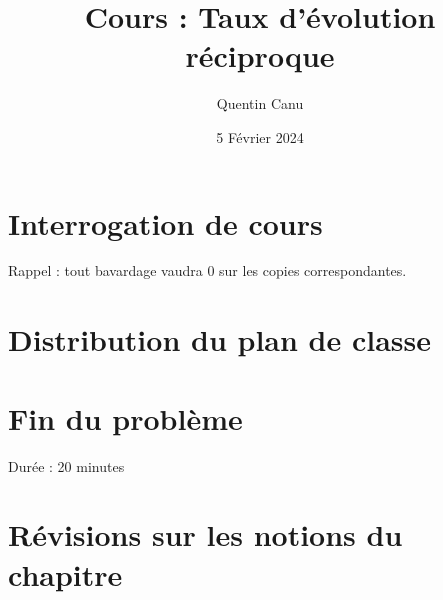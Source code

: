 \documentclass{article}
\title{Cours : Taux d'évolution réciproque}
\date{5 Février 2024}
\author{Quentin Canu}
\begin{document}
\maketitle
\section{Interrogation de cours}
Rappel : tout bavardage vaudra 0 sur les copies correspondantes.
\section{Distribution du plan de classe}
\section{Fin du problème}
Durée : 20 minutes
\section{Révisions sur les notions du chapitre}
\end{document}
